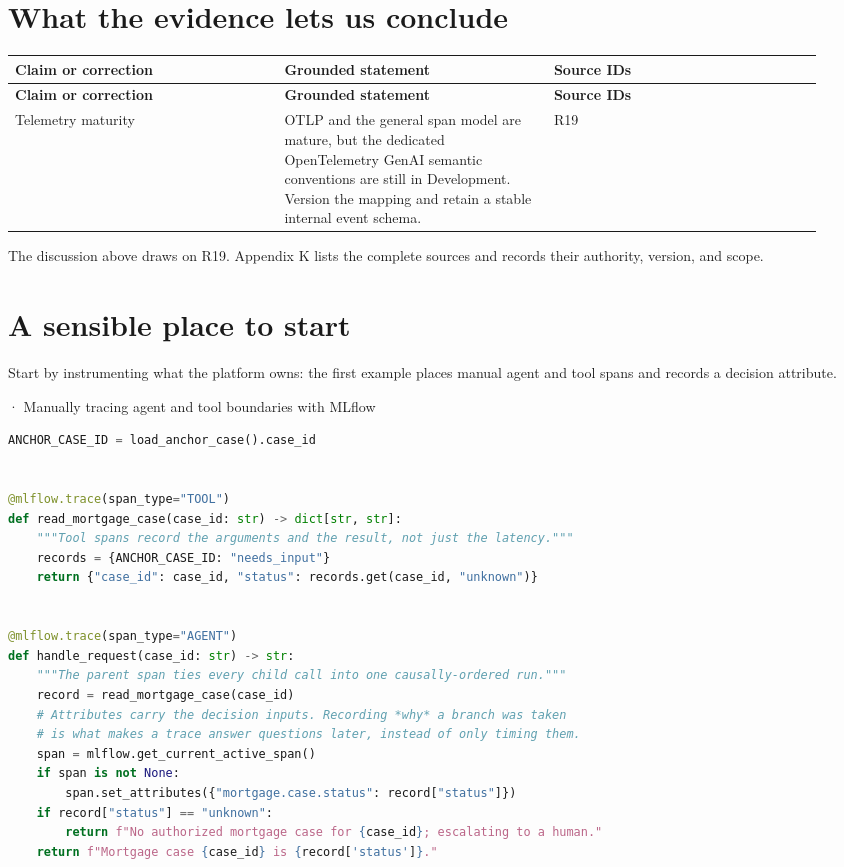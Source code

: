 \section{What the evidence lets us conclude}

\BookTableStart
\small
\begin{longtable}{@{}Y{0.3133\linewidth}Y{0.3133\linewidth}Y{0.3133\linewidth}@{}}
\color{white}\bfseries \textbf{Claim or correction} & \color{white}\bfseries \textbf{Grounded statement} & \color{white}\bfseries \textbf{Source IDs} \\
\endfirsthead
{}
\color{white}\bfseries \textbf{Claim or correction} & \color{white}\bfseries \textbf{Grounded statement} & \color{white}\bfseries \textbf{Source IDs} \\
\endhead
Telemetry maturity & OTLP and the general span model are mature, but the dedicated OpenTelemetry GenAI semantic conventions are still in Development. Version the mapping and retain a stable internal event schema. & R19 \\
\end{longtable}
\BookTableEnd

The discussion above draws on R19. Appendix K lists the complete sources and records their authority, version, and scope.\par

\section{A sensible place to start}

Start by instrumenting what the platform owns: the first example places manual agent and tool spans and records a decision attribute.\par

\BookSnake · Manually tracing agent and tool boundaries with MLflow\par

\needspace{222.4pt}
\begin{lstlisting}[style=bookcode,title={\BookSnake},language=Python]
ANCHOR_CASE_ID = load_anchor_case().case_id


@mlflow.trace(span_type="TOOL")
def read_mortgage_case(case_id: str) -> dict[str, str]:
    """Tool spans record the arguments and the result, not just the latency."""
    records = {ANCHOR_CASE_ID: "needs_input"}
    return {"case_id": case_id, "status": records.get(case_id, "unknown")}


@mlflow.trace(span_type="AGENT")
def handle_request(case_id: str) -> str:
    """The parent span ties every child call into one causally-ordered run."""
    record = read_mortgage_case(case_id)
    # Attributes carry the decision inputs. Recording *why* a branch was taken
    # is what makes a trace answer questions later, instead of only timing them.
    span = mlflow.get_current_active_span()
    if span is not None:
        span.set_attributes({"mortgage.case.status": record["status"]})
    if record["status"] == "unknown":
        return f"No authorized mortgage case for {case_id}; escalating to a human."
    return f"Mortgage case {case_id} is {record['status']}."
\end{lstlisting}

